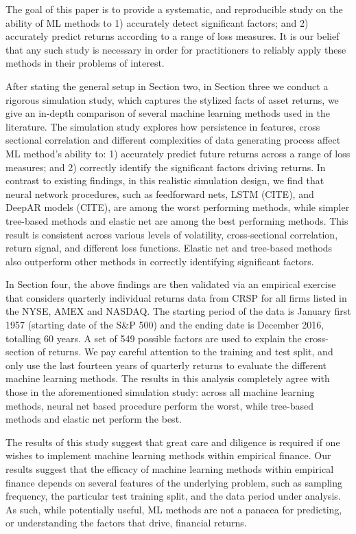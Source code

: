 \documentclass{article}
\begin{document}
The goal of this paper is to provide a systematic, and reproducible study on the ability of ML methods to 1) accurately detect significant factors; and 2) accurately predict returns according to a range of loss measures. It is our belief that any such study is necessary in order for practitioners to reliably apply these methods in their problems of interest. 

After stating the general setup in Section two, in Section three we conduct a rigorous simulation study, which captures the stylized facts of asset returns, we give an in-depth comparison of several machine learning methods used in the literature. The simulation study explores how persistence in features, cross sectional correlation and different complexities of data generating process affect ML method's ability to: 1) accurately predict future returns across a range of loss measures; and 2) correctly identify the significant factors driving returns. In contrast to existing findings, in this realistic simulation design, we find that neural network procedures, such as feedforward nets, LSTM (CITE), and DeepAR models (CITE), are among the worst performing methods, while simpler tree-based methods and elastic net are among the best performing methods. This result is consistent across various levels of volatility, cross-sectional correlation, return signal, and different loss functions. Elastic net and tree-based methods also outperform other methods in correctly identifying significant factors.     

In Section four, the above findings are then validated via an empirical exercise that considers quarterly individual returns data from CRSP for all firms listed in the NYSE, AMEX and NASDAQ. The starting period of the data is January first 1957 (starting date of the S\&P 500) and the ending date is December 2016, totalling 60 years. A set of 549 possible factors are used to explain the cross-section of returns. We pay careful attention to the training and test split, and only use the last fourteen years of quarterly returns to evaluate the different machine learning methods. The results in this analysis completely agree with those in the aforementioned simulation study: across all machine learning methods, neural net based procedure perform the worst, while tree-based methods and elastic net perform the best. 


The results of this study suggest that great care and diligence is required if one wishes to implement machine learning methods within empirical finance. Our results suggest that the efficacy of machine learning methods within empirical finance depends on several features of the underlying problem, such as sampling frequency, the particular test training split, and the data period under analysis. As such, while potentially useful, ML methods are not a panacea for predicting, or understanding the factors that drive, financial returns. 
\end{document}
